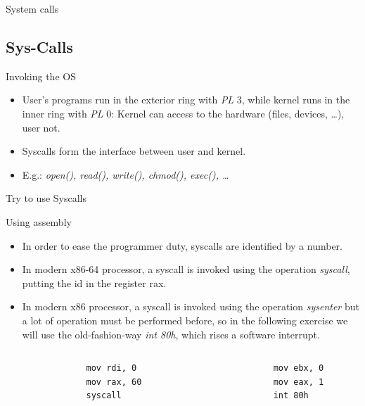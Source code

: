 \begin{frame}{System calls}
	\subsection{Sys-Calls}
	\begin{block}{Invoking the OS}
		\begin{itemize}
			\item User's programs run in the exterior ring with \emph{PL} 3, while
				kernel runs in the inner ring with \emph{PL} 0: Kernel can access to
				the hardware (files, devices, \ldots), user not.
			\item Syscalls form the interface between user and kernel.
			\item E.g.: \emph{open(), read(), write(), chmod(), exec(), \ldots}
		\end{itemize}
	\end{block}
\end{frame}

\begin{frame}[fragile]{Try to use Syscalls}
	\begin{block}{Using assembly}
		\begin{itemize}
			\item In order to ease the programmer duty, syscalls are identified by a
				number.
			\item In modern x86-64 processor, a syscall is invoked using the
				operation \emph{syscall}, putting the id in the register rax.
			\item In modern x86 processor, a syscall is invoked using the
				operation \emph{sysenter} but a lot of operation must be performed
				before, so in the following exercise we will use the old-fashion-way
				\emph{int 80h}, which rises a software interrupt.
		\end{itemize}
	\end{block}
	\acode
	\begin{columns}[T]
		\begin{column}{.4\textwidth}
			\begin{lstlisting}
				mov rdi, 0
				mov rax, 60
				syscall
			\end{lstlisting}
		\end{column}
		\begin{column}{.4\textwidth}
			\begin{lstlisting}
				mov ebx, 0
				mov eax, 1
				int 80h
			\end{lstlisting}
		\end{column}
	\end{columns}
\end{frame}

